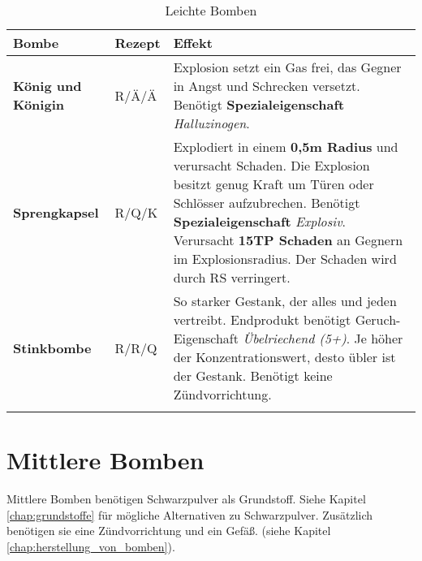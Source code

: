 \begin{longtable}{|p{4cm}|p{}|p{9cm}|}
\hline
\textbf{Bombe} & \textbf{Rezept} & \textbf{Effekt} \\ \hline

\textbf{König und Königin} & R/Ä/Ä & Explosion setzt ein Gas frei, das Gegner in Angst und Schrecken versetzt. Benötigt \textbf{Spezialeigenschaft} \textit{Halluzinogen}. \\ \hline

\textbf{Sprengkapsel} & R/Q/K & Explodiert in einem \textbf{0,5m Radius} und verursacht Schaden. Die Explosion besitzt genug Kraft um Türen oder Schlösser aufzubrechen. Benötigt \textbf{Spezialeigenschaft} \textit{Explosiv}. Verursacht \textbf{15TP Schaden} an Gegnern im Explosionsradius. Der Schaden wird durch RS verringert. \\ \hline

\textbf{Stinkbombe} & R/R/Q & So starker Gestank, der alles und jeden vertreibt. Endprodukt benötigt Geruch-Eigenschaft \textit{Übelriechend (5+)}. Je höher der Konzentrationswert, desto übler ist der Gestank. Benötigt keine Zündvorrichtung. \\ \hline

\caption{Leichte Bomben}
\label{tab:leichte_bomben}
\end{longtable}


\section{Mittlere Bomben}
Mittlere Bomben benötigen Schwarzpulver als Grundstoff. Siehe Kapitel \ref{chap:grundstoffe} für mögliche Alternativen zu Schwarzpulver. Zusätzlich benötigen sie eine Zündvorrichtung und ein Gefäß. (siehe Kapitel \ref{chap:herstellung_von_bomben}).


